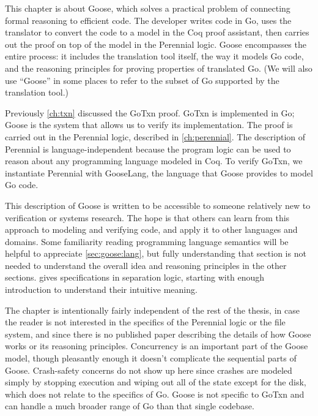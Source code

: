 This chapter is about Goose, which solves a practical
problem of connecting formal reasoning to efficient code. The developer writes
code in Go, uses the  translator to convert the code to a model in the Coq proof
assistant, then carries out the proof on top of the model in the Perennial
logic. Goose encompasses
the entire process: it includes the translation tool itself, the way it models Go
code, and the reasoning principles for proving properties of translated
Go. (We will also use ``Goose'' in some places to refer to the subset of Go
supported by the translation tool.)

Previously \cref{ch:txn} discussed the GoTxn proof. GoTxn is implemented in Go;
Goose is the system that allows us to verify its implementation. The proof is
carried out in the Perennial logic, described in \cref{ch:perennial}.
The description of Perennial is language-independent because the program logic can be used to reason about any programming language modeled in Coq.
To verify GoTxn, we instantiate Perennial with GooseLang, the language that
Goose provides to model Go code.

This description of Goose is written to be accessible to someone relatively new
to verification or systems research. The hope is that others can learn from this
approach to modeling and verifying code, and apply it to other languages and
domains. Some familiarity reading programming language semantics will be helpful
to appreciate \cref{sec:goose:lang}, but fully understanding that section is not
needed to understand the overall idea and reasoning principles in the other
sections.  gives specifications in separation logic,
starting with enough introduction to understand their intuitive meaning.

The chapter is intentionally fairly independent of the rest of the thesis, in
case the reader is not interested in the specifics of the Perennial logic or the file system,
and since there is no published paper describing the details of
how Goose works or its reasoning principles. Concurrency is an important part of
the Goose model, though pleasantly enough it doesn't complicate the sequential
parts of Goose. Crash-safety concerns do not show up here since crashes are
modeled simply by stopping execution and wiping out all of the state except for
the disk, which does not relate to the specifics of Go. Goose is not specific to
GoTxn and can handle a much broader range of Go than that single codebase.








